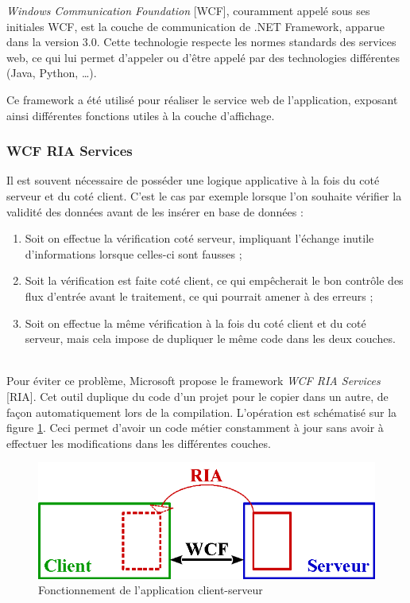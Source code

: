 
\textit{Windows Communication Foundation} [WCF], couramment appelé sous ses initiales WCF, est la couche de communication de .NET Framework, apparue dans la version 3.0.
Cette technologie respecte les normes standards des services web, ce qui lui permet d'appeler ou d'être appelé par des technologies différentes (Java, Python, \ldots).

Ce framework a été utilisé pour réaliser le service web de l'application, exposant ainsi différentes fonctions utiles à la couche d'affichage.


\subsubsection{WCF RIA Services}

Il est souvent nécessaire de posséder une logique applicative à la fois du coté serveur et du coté client.
C'est le cas par exemple lorsque l'on souhaite vérifier la validité des données avant de les insérer en base de données :
\begin{enumerate}
	\item Soit on effectue la vérification coté serveur, impliquant l'échange inutile d'informations lorsque celles-ci sont fausses ;
	\item Soit la vérification est faite coté client, ce qui empêcherait le bon contrôle des flux d'entrée avant le traitement, ce qui pourrait amener à des erreurs ;
	\item Soit on effectue la même vérification à la fois du coté client et du coté serveur, mais cela impose de dupliquer le même code dans les deux couches.
\end{enumerate}
~~\\

Pour éviter ce problème, Microsoft propose le framework \textit{WCF RIA Services} [RIA].
Cet outil duplique du code d'un projet pour le copier dans un autre, de façon automatiquement lors de la compilation.
L'opération est schématisé sur la figure \ref{WCF_RIA_Services}.
Ceci permet d'avoir un code métier constamment à jour sans avoir à effectuer les modifications dans les différentes couches.
\begin{figure}[!h]
	\center
	\includegraphics[width=1\textwidth]{img/WCF_RIA_Services.png}
	\caption{Fonctionnement de l'application client-serveur}
	\label{WCF_RIA_Services}
\end{figure}

